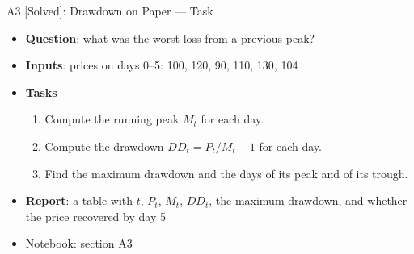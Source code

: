 \begin{frame}{A3 [Solved]: Drawdown on Paper --- Task}
\itemsize{\small}
\begin{itemize}
\item \textbf{Question}: what was the worst loss from a previous peak?
\item \textbf{Inputs}: prices on days 0--5: 100, 120, 90, 110, 130, 104
\item \textbf{Tasks}
\begin{enumerate}
    \item Compute the running peak $M_t$ for each day.
    \item Compute the drawdown $DD_t = P_t / M_t - 1$ for each day.
    \item Find the maximum drawdown and the days of its peak and of its trough.
\end{enumerate}
\item \textbf{Report}: a table with $t$, $P_t$, $M_t$, $DD_t$, the maximum drawdown, and whether the price recovered by day 5
\item Notebook: section A3
\end{itemize}
\end{frame}

